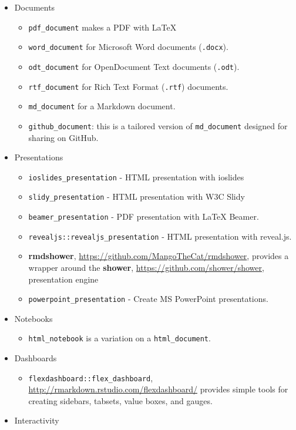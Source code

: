 \documentclass[]{book}
\providecommand{\tightlist}{%
  \setlength{\itemsep}{0pt}\setlength{\parskip}{0pt}}
\begin{document}
\begin{itemize}
\tightlist
\item
  Documents

  \begin{itemize}
  \tightlist
  \item
    \texttt{pdf\_document} makes a PDF with LaTeX
  \item
    \texttt{word\_document} for Microsoft Word documents
    (\texttt{.docx}).
  \item
    \texttt{odt\_document} for OpenDocument Text documents
    (\texttt{.odt}).
  \item
    \texttt{rtf\_document} for Rich Text Format (\texttt{.rtf})
    documents.
  \item
    \texttt{md\_document} for a Markdown document.
  \item
    \texttt{github\_document}: this is a tailored version of
    \texttt{md\_document} designed for sharing on GitHub.
  \end{itemize}
\item
  Presentations

  \begin{itemize}
  \tightlist
  \item
    \texttt{ioslides\_presentation} - HTML presentation with ioslides
  \item
    \texttt{slidy\_presentation} - HTML presentation with W3C Slidy
  \item
    \texttt{beamer\_presentation} - PDF presentation with LaTeX Beamer.
  \item
    \texttt{revealjs::revealjs\_presentation} - HTML presentation with
    reveal.js.
  \item
    \textbf{rmdshower}, \url{https://github.com/MangoTheCat/rmdshower},
    provides a wrapper around the \textbf{shower},
    \url{https://github.com/shower/shower}, presentation engine
  \item
    \texttt{powerpoint\_presentation} - Create MS PowerPoint
    presentations.
  \end{itemize}
\item
  Notebooks

  \begin{itemize}
  \tightlist
  \item
    \texttt{html\_notebook} is a variation on a \texttt{html\_document}.
  \end{itemize}
\item
  Dashboards

  \begin{itemize}
  \tightlist
  \item
    \texttt{flexdashboard::flex\_dashboard},
    \url{http://rmarkdown.rstudio.com/flexdashboard/} provides simple
    tools for creating sidebars, tabsets, value boxes, and gauges.
  \end{itemize}
\item
  Interactivity


\end{itemize}
\end{document}
